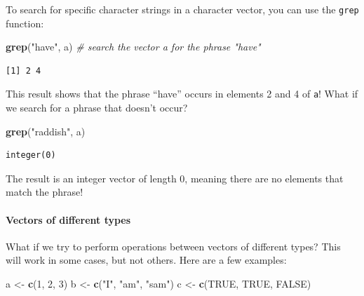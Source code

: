 \documentclass[
]{article}
\newenvironment{Shaded}{\begin{snugshade}}{\end{snugshade}}
\newcommand{\CommentTok}[1]{\textcolor[rgb]{0.56,0.35,0.01}{\textit{#1}}}
\newcommand{\DecValTok}[1]{\textcolor[rgb]{0.00,0.00,0.81}{#1}}
\newcommand{\KeywordTok}[1]{\textcolor[rgb]{0.13,0.29,0.53}{\textbf{#1}}}
\newcommand{\NormalTok}[1]{#1}
\newcommand{\OtherTok}[1]{\textcolor[rgb]{0.56,0.35,0.01}{#1}}
\newcommand{\StringTok}[1]{\textcolor[rgb]{0.31,0.60,0.02}{#1}}
\begin{document}
To search for specific character strings in a character vector, you can use the \texttt{grep} function:

\begin{Shaded}
\begin{Highlighting}[]
\KeywordTok{grep}\NormalTok{(}\StringTok{"have"}\NormalTok{, a)   }\CommentTok{# search the vector a for the phrase "have"}
\end{Highlighting}
\end{Shaded}

\begin{verbatim}
[1] 2 4
\end{verbatim}

This result shows that the phrase ``have'' occurs in elements 2 and 4 of \texttt{a}!
What if we search for a phrase that doesn't occur?

\begin{Shaded}
\begin{Highlighting}[]
\KeywordTok{grep}\NormalTok{(}\StringTok{"raddish"}\NormalTok{, a)}
\end{Highlighting}
\end{Shaded}

\begin{verbatim}
integer(0)
\end{verbatim}

The result is an integer vector of length 0, meaning there are no elements that match the phrase!

\hypertarget{vectors-of-different-types}{%
\paragraph{Vectors of different types}\label{vectors-of-different-types}}

What if we try to perform operations between vectors of different types?
This will work in some cases, but not others. Here are a few examples:

\begin{Shaded}
\begin{Highlighting}[]
\NormalTok{a <-}\StringTok{ }\KeywordTok{c}\NormalTok{(}\DecValTok{1}\NormalTok{, }\DecValTok{2}\NormalTok{, }\DecValTok{3}\NormalTok{)}
\NormalTok{b <-}\StringTok{ }\KeywordTok{c}\NormalTok{(}\StringTok{"I"}\NormalTok{, }\StringTok{"am"}\NormalTok{, }\StringTok{"sam"}\NormalTok{)}
\NormalTok{c <-}\StringTok{ }\KeywordTok{c}\NormalTok{(}\OtherTok{TRUE}\NormalTok{, }\OtherTok{TRUE}\NormalTok{, }\OtherTok{FALSE}\NormalTok{)}
\end{Highlighting}
\end{Shaded}
\end{document}
